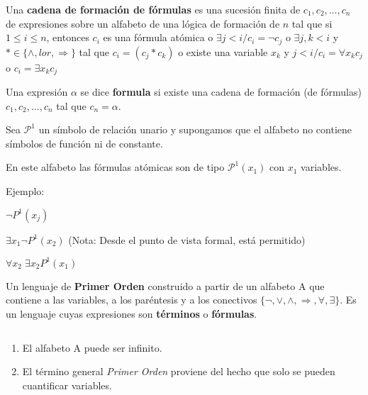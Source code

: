 \begin{definition}

Una \textbf{cadena de formaci\'on de f\'ormulas} es una sucesi\'on finita de $c_1, c_2, \ldots, c_n$ de expresiones sobre un alfabeto de una l\'ogica de formaci\'on de $n$ tal que si $1 \leq i \leq n$, entonces $c_i$ es una f\'ormula at\'omica o $\exists j < i / c_i = \neg c_j$ o $\exists j, k < i$ y $* \in \{\land, lor,  \Rightarrow \}$ tal que $c_i = (c_j * c_k)$ o existe una variable $x_k$ y $j < i / c_i = \forall x_k c_j$ o $c_i = \exists x_k c_j$

\end{definition}

\begin{definition}

Una expresi\'on $\alpha$ se dice \textbf{formula} si existe una cadena de formaci\'on (de f\'ormulas) $c_1, c_2, \ldots, c_n$ tal que $c_n = \alpha$.

\end{definition}

\begin{example}

Sea $\mathcal{P}^1$ un s\'imbolo de relaci\'on unario y supongamos que el alfabeto no contiene s\'imbolos de funci\'on ni de constante.

En este alfabeto las f\'ormulas at\'omicas son de tipo $\mathcal{P}^1(x_1)$ con $x_1$ variables.

Ejemplo:

$\neg P^1(x_j)$

$\exists x_1 \neg P^1(x_2)$ (Nota: Desde el punto de vista formal, est\'a permitido)

$\forall x_2 \; \exists x_2 P^1(x_1)$

\end{example}

Un lenguaje de \textbf{Primer Orden} construido a partir de un alfabeto A que contiene a las variables, a los par\'entesis y a los conectivos $\{ \neg, \lor, \land, \Rightarrow, \forall, \exists \}$. Es un lenguaje cuyas expresiones son \textbf{t\'erminos} o \textbf{f\'ormulas}.

\begin{observation}
$\;$
\begin{enumerate}
	\item El alfabeto A puede ser infinito.
	\item El t\'ermino general \textit{Primer Orden} proviene del hecho que solo se pueden cuantificar variables.
\end{enumerate}

\end{observation}

